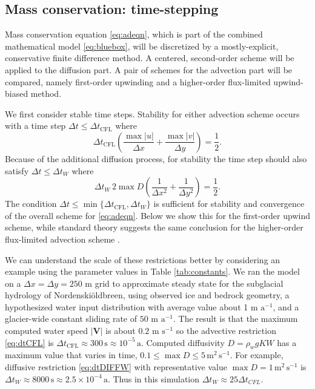 \documentclass[gmd]{copernicus}   %
\newcommand{\text}{\textrm}
\newcommand\bV{\mathbf{V}}
\newcommand{\Nbreen}{Nordenski\"oldbreen\xspace}
\begin{document}
\subsection{Mass conservation: time-stepping}  Mass conservation equation \eqref{eq:adeqn}, which is part of the combined mathematical model \eqref{eq:bluebox}, will be discretized by a mostly-explicit, conservative finite difference method.   A centered, second-order scheme will be applied to the diffusion part.  A pair of schemes for the advection part will be compared, namely first-order upwinding and a higher-order flux-limited upwind-biased method.

We first consider stable time steps.  Stability for either advection scheme occurs with a time step $\Delta t \le \Delta t_{\text{CFL}}$ where
\begin{equation}
\Delta t_{\text{CFL}} \left(\frac{\max |u|}{\Delta x} + \frac{\max |v|}{\Delta y}\right) = \frac{1}{2}. \label{eq:dtCFL}
\end{equation}
Because of the additional diffusion process, for stability the time step should also satisfy $\Delta t \le \Delta t_{W}$  where \citep{MortonMayers}
\begin{equation}
\Delta t_W\, 2 \max D \left(\frac{1}{\Delta x^2} + \frac{1}{\Delta y^2}\right) = \frac{1}{2}. \label{eq:dtDIFFW}
\end{equation}
The condition $\Delta t \le \min\{\Delta t_{\text{CFL}}, \Delta t_W\}$ is sufficient for stability and convergence of the overall scheme for \eqref{eq:adeqn}.  Below we show this for the first-order upwind scheme, while standard theory suggests the same conclusion for the higher-order flux-limited advection scheme \citep{HundsdorferVerwer2010}.

We can understand the scale of these restrictions better by considering an example using the parameter values in Table \ref{tab:constants}.  We ran the model on a $\Delta x = \Delta y = 250$ m grid to approximate steady state for the subglacial hydrology of \Nbreen \citep{vanPeltetal}, using observed ice and bedrock geometry, a hypothesized water input distribution with average value about 1 m $\text{a}^{-1}$, and a glacier-wide constant sliding rate of $50$ m $\text{a}^{-1}$.  The result is that the maximum computed water speed $|\bV|$ is about $0.2$ m $\text{s}^{-1}$ so the advective restriction \eqref{eq:dtCFL} is $\Delta t_{\text{CFL}} \approx 300\,\text{s} \approx 10^{-5}\,\text{a}$.  Computed diffusivity $D = \rho_w g K W$ has a maximum value that varies in time, $0.1 \le \max D \le 5 \,\text{m}^2\,\text{s}^{-1}$.  For example, diffusive restriction \eqref{eq:dtDIFFW} with representative value $\max D=1\,\text{m}^2\,\text{s}^{-1}$ is $\Delta t_W \approx 8000\,\text{s} \approx 2.5 \times 10^{-4}\,\text{a}$.  Thus in this simulation $\Delta t_W \approx 25 \Delta t_{CFL}$.
\end{document}
